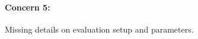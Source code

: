 \documentclass[12pt,one-column]{article}
\begin{document}

{\it \paragraph{Concern 5:}Missing details on evaluation setup and parameters.}
\end{document}
